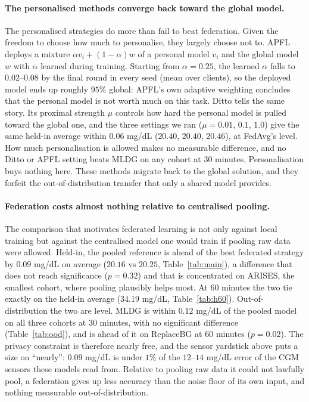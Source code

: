 \documentclass[10pt,letterpaper]{article}
\begin{document}
\paragraph{The personalised methods converge back toward the global model.} The
personalised strategies do more than fail to beat federation. Given the freedom
to choose how much to personalise, they largely choose not to. APFL deploys a
mixture $\alpha v_i + (1-\alpha) w$ of a personal model $v_i$ and the global model
$w$ with $\alpha$ learned during training. Starting from $\alpha = 0.25$, the
learned $\alpha$ falls to $0.02$--$0.08$ by the final round in every seed
(mean over clients), so the deployed model ends up roughly $95\%$ global: APFL's
own adaptive weighting concludes that the personal model is not worth much on this
task. Ditto tells the same story. Its proximal strength $\mu$ controls how
hard the personal model is pulled toward the global one, and the three
settings we ran ($\mu = 0.01$, $0.1$, $1.0$) give the same held-in average
within $0.06$ mg/dL ($20.40$, $20.40$, $20.46$), at FedAvg's level. How much
personalisation is allowed makes no measurable difference, and no Ditto or
APFL setting beats MLDG on any cohort at 30 minutes. Personalisation buys
nothing here. These methods migrate back to the global solution, and they
forfeit the out-of-distribution transfer that only a shared model provides.

\paragraph{Federation costs almost nothing relative to centralised pooling.}
The comparison that motivates federated learning is not only against local
training but against the centralised model one would train if pooling raw data
were allowed. Held-in, the pooled reference is ahead of the best federated
strategy by $0.09$ mg/dL on average ($20.16$ vs $20.25$,
Table~\ref{tab:main}), a difference that does not reach significance
($p = 0.32$) and that is concentrated on ARISES, the smallest cohort, where
pooling plausibly helps most. At 60 minutes the two tie exactly on the
held-in average ($34.19$ mg/dL, Table~\ref{tab:h60}). Out-of-distribution
the two are level. MLDG is within $0.12$ mg/dL of the pooled model on all
three cohorts at 30 minutes, with no significant difference
(Table~\ref{tab:ood}), and is ahead of it on ReplaceBG at 60 minutes
($p = 0.02$). The privacy constraint is therefore nearly free, and the sensor
yardstick above puts a size on ``nearly'': $0.09$ mg/dL is under $1\%$ of the
$12$--$14$ mg/dL error of the CGM sensors these models read from. Relative to
pooling raw data it could not lawfully pool, a federation gives up less
accuracy than the noise floor of its own input, and nothing measurable
out-of-distribution.
\end{document}
